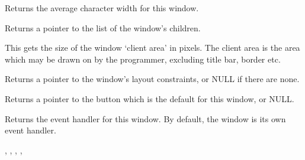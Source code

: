 Returns the average character width for this window.



Returns a pointer to the list of the window's children.

\label{wxwindowgetclientsize}


This gets the size of the window `client area' in pixels.  The client area is the
area which may be drawn on by the programmer, excluding title bar, border etc.




\label{wxwindowgetconstraints}


Returns a pointer to the window's layout constraints, or NULL if there are none.

\label{wxwindowgetdefaultitem}


Returns a pointer to the button which is the default for this window, or NULL.

\label{wxwindowgeteventhandler}


Returns the event handler for this window. By default, the window is its
own event handler.


,\rtfsp
{},\rtfsp
{},\rtfsp
{},\rtfsp
{}\rtfsp

\label{wxwindowgetfont}


